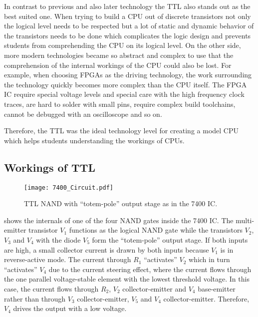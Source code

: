 In contrast to previous and also later technology the \gls{TTL} also stands out as the best suited one.
When trying to build a \gls{CPU} out of discrete transistors not only the logical level needs to be respected but a lot of static and dynamic behavior of the transistors needs to be done which complicates the logic design and prevents students from comprehending the \gls{CPU} on its logical level.
On the other side, more modern technologies became so abstract and complex to use that the comprehension of the internal workings of the \gls{CPU} could also be lost.
For example, when choosing \glspl{FPGA} as the driving technology, the work surrounding the technology quickly becomes more complex than the \gls{CPU} itself.
The \gls{FPGA} \gls{IC} require special voltage levels and special care with the high frequency clock traces, are hard to solder with small pins, require complex build toolchains, cannot be debugged with an oscilloscope and so on.

Therefore, the \gls{TTL} was the ideal technology level for creating a model \gls{CPU} which helps students understanding the workings of \glspl{CPU}.

\subsection{Workings of \gls{TTL}}\label{sec:ttl}
\begin{figure}[t]
  \centering
  \texttt{[image: 7400\_Circuit.pdf]}
  \caption{\gls{TTL} NAND with ``totem-pole'' output stage as in the 7400 \gls{IC}. \cite{7400_Circuit}}
  \label{fig:7400_Circuit}
\end{figure}

 shows the internals of one of the four NAND gates inside the 7400 \gls{IC}.
The multi-emitter transistor $V_1$ functions as the logical NAND gate while the transistors $V_2$, $V_3$ and $V_4$ with the diode $V_5$ form the ``totem-pole'' output stage.
If both inputs are high, a small collector current is drawn by both inputs because $V_1$ is in reverse-active mode.
The current through $R_1$ ``activates'' $V_2$ which in turn ``activates'' $V_4$ due to the current steering effect, where the current flows through the one parallel voltage-stable element with the lowest threshold voltage.
In this case, the current flows through $R_2$, $V_2$ collector-emitter and $V_4$ base-emitter rather than through $V_3$ collector-emitter, $V_5$ and $V_4$ collector-emitter.
Therefore, $V_4$ drives the output with a low voltage.

